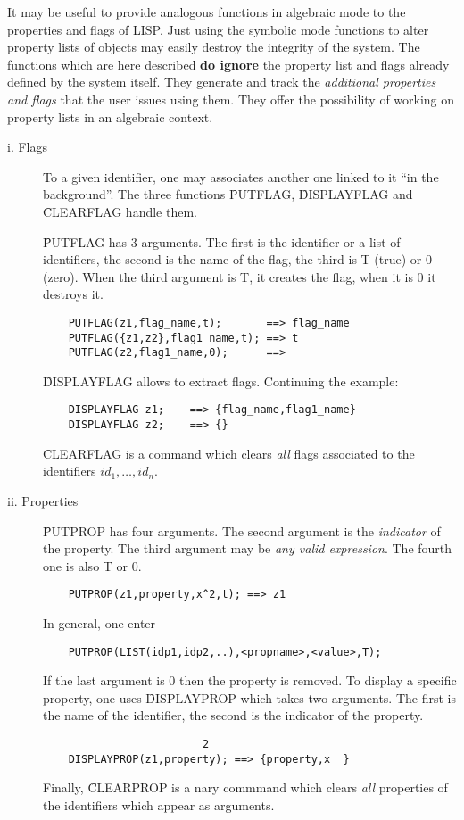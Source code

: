 It may be useful to provide analogous functions in algebraic mode to
the properties and flags of LISP.  Just using the symbolic mode
functions to alter property lists of objects may easily destroy the
integrity of the system.  The functions which are here described {\bf
do ignore} the property list and flags already defined by the system
itself.  They generate and track the {\em additional properties and
flags} that the user issues using them.  They offer the possibility of
working on property lists in an algebraic context.
\begin{description}
\item[i. Flags]
To a given identifier, one may
associates another one linked to it ``in the background''. The three
functions \f{PUTFLAG},
\f{DISPLAYFLAG} and
\f{CLEARFLAG} handle them.

\f{PUTFLAG} has 3 arguments. The first is the identifier or a list
of identifiers, the second is the name of the flag,
the third is T (true) or 0 (zero).
When the third argument is T, it creates the flag, when it is 0 it
destroys it.
\begin{verbatim}
	PUTFLAG(z1,flag_name,t);       ==> flag_name
	PUTFLAG({z1,z2},flag1_name,t); ==> t
	PUTFLAG(z2,flag1_name,0);      ==>
\end{verbatim}
\f{DISPLAYFLAG} allows to extract flags. Continuing the example:
\begin{verbatim}
	DISPLAYFLAG z1;    ==> {flag_name,flag1_name}
	DISPLAYFLAG z2;    ==> {}
\end{verbatim}
\f{CLEARFLAG} is a command which clears {\em all} flags associated to
the identifiers $id_1, \ldots , id_n$.
\item[ii. Properties]
\f{PUTPROP} has four arguments.  The second argument
is the {\em indicator} of the property. The third argument may
be {\em any valid expression}. The fourth one is also T or 0.
\begin{verbatim}
	PUTPROP(z1,property,x^2,t); ==> z1
\end{verbatim}
In general, one enter
\begin{verbatim}
	PUTPROP(LIST(idp1,idp2,..),<propname>,<value>,T);
\end{verbatim}
If the last argument is 0 then the property is removed.
To display a specific property, one uses
\f{DISPLAYPROP} which takes two arguments. The first is the name of the
identifier, the second is the indicator of the property.
\begin{verbatim}
						 2
	DISPLAYPROP(z1,property); ==> {property,x  }
\end{verbatim}
Finally, \f{CLEARPROP} is a nary commmand which clears {\em all}
properties of the identifiers which appear as arguments.
\end{description}

